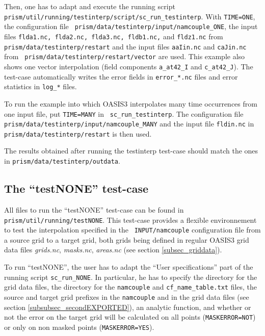 Then, one has to adapt and execute the running script {\tt
  prism/util/running/testinterp/\break script/sc\_run\_testinterp}.
With {\tt TIME=ONE}, the configuration file {\tt
  prism/data/testinterp/\break input/namcouple\_ONE}, the input files
{\tt flda1.nc, flda2.nc, flda3.nc, fldb1.nc,} 
and {\tt fldz1.nc} from {\tt prism/data/testinterp/restart} and the
input files {\tt aaIin.nc} and {\tt caJin.nc} from {\tt
  prism/data/testinterp/restart/vector} are used.  This example also
shows one vector interpolation (field components {\tt a\_at42\_I} and
{\tt c\_at42\_J}).  The test-case automatically writes the error
fields in {\tt error\_*.nc} files and error statistics in {\tt log\_*}
files.

To run the example into which OASIS3 interpolates many time
occurrences from one input file, put {\tt TIME=MANY} in {\tt
  sc\_run\_testinterp}.  The configuration file {\tt
  prism/data/testinterp/input/\break namcouple\_MANY} and the input
file {\tt fldin.nc} in {\tt prism/data/testinterp/restart} is then
used.

The results obtained after running the testinterp test-case should
match the ones in {\tt prism/data/\break testinterp/outdata}.


\subsection{The ``testNONE'' test-case}
\label{subsec_running_testnone}

All files to run the ``testNONE'' test-case can be found in {\tt
  prism/util/running/testNONE}. This test-case provides a flexible
environnement to test the interpolation specified in the {\tt
  INPUT/namcouple} configuration file from a source grid to a target
grid, both grids being defined in regular OASIS3 grid data files {\it
  grids.nc}, {\it masks.nc}, {\it areas.nc} (see section
\ref{subsec_griddata}). 

To run ``testNONE'', the user has to adapt the ``User specifications''
part of the running script {\tt sc\_run\_NONE}. In particular, he has
to specify the directory for the grid data files, the directory for
the {\tt namcouple} and {\tt cf\_name\_table.txt} files, the source
and target grid prefixes in the {\tt namcouple} and in the grid data
files (see section \ref{subsubsec_secondEXPORTED}), an analytic
function, and whether or not the error on the target grid will be
calculated on all points ({\tt MASKERROR=NOT}) or only on non masked
points ({\tt MASKERROR=YES}).

